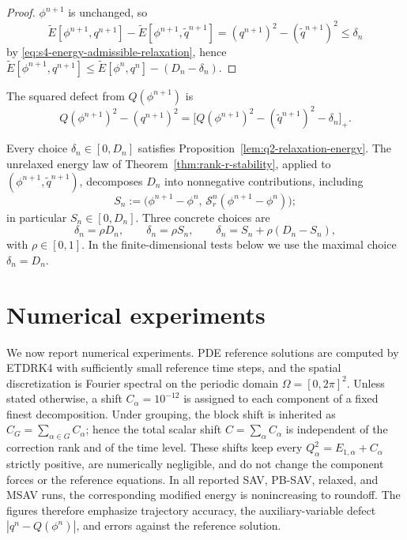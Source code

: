 \documentclass[10pt,onefignum,onetabnum,hidelinks]{siamart251216}
\begin{document}
\begin{proof}
$\phi^{n+1}$ is unchanged, so
\[
\widetilde E[\phi^{n+1},q^{n+1}]
-
\widetilde E[\phi^{n+1},\widetilde q^{n+1}]
=
(q^{n+1})^2-(\widetilde q^{n+1})^2
\le
\delta_n
\]
by \eqref{eq:s4-energy-admissible-relaxation}, hence
$\widetilde E[\phi^{n+1},q^{n+1}]
\le \widetilde E[\phi^n,q^n]-(D_n-\delta_n)$.
\end{proof}

The squared defect from \(Q(\phi^{n+1})\) is
\[
Q(\phi^{n+1})^2-(q^{n+1})^2
=
\bigl[Q(\phi^{n+1})^2-(\widetilde q^{n+1})^2-\delta_n\bigr]_+.
\]

Every choice $\delta_n\in[0,D_n]$ satisfies Proposition~\ref{lem:q2-relaxation-energy}.  The unrelaxed energy law of Theorem~\ref{thm:rank-r-stability}, applied to $(\phi^{n+1},\widetilde q^{n+1})$, decomposes $D_n$ into nonnegative contributions, including
\[
S_n:=\bigl(\phi^{n+1}-\phi^n,\,\mathcal S_r^n(\phi^{n+1}-\phi^n)\bigr);
\]
in particular $S_n\in[0,D_n]$. Three concrete choices are
\begin{equation}
\delta_n=\rho D_n,
\qquad
\delta_n=\rho S_n,
\qquad
\delta_n=S_n+\rho(D_n-S_n),
\label{eq:s4-delta-choices}
\end{equation}
with $\rho \in[0,1]$. In the finite-dimensional tests below we use the maximal choice $\delta_n=D_n$.

\section{Numerical experiments}
\label{sec:numerics}

We now report numerical experiments. PDE reference solutions are computed by ETDRK4 \cite{cox2002exponential} with sufficiently small reference time steps, and the spatial discretization is Fourier spectral on the periodic domain $\Omega=[0,2\pi]^2$. Unless stated otherwise, a shift \(C_\alpha=10^{-12}\) is assigned to each component of a fixed finest decomposition. Under grouping, the block shift is inherited as \(C_G=\sum_{\alpha\in G}C_\alpha\); hence the total scalar shift \(C=\sum_\alpha C_\alpha\) is independent of the correction rank and of the time level. These shifts keep every \(Q_\alpha^2=E_{1,\alpha}+C_\alpha\) strictly positive, are numerically negligible, and do not change the component forces or the reference equations. In all reported SAV, PB-SAV, relaxed, and MSAV runs, the corresponding modified energy is nonincreasing to roundoff. The figures therefore emphasize trajectory accuracy, the auxiliary-variable defect $|q^n-Q(\phi^n)|$, and errors against the reference solution.
\end{document}
